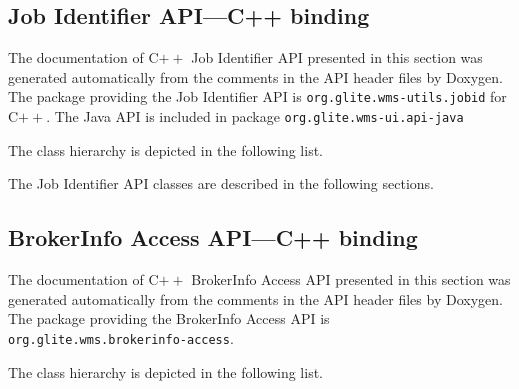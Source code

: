 \documentclass{egee}
\begin{document}
\subsection{Job Identifier API---C++ binding}
\label{jobidcpp}
{
\renewenvironment{CompactList}{\itemize\itemsep -2pt}{\enditemize}
\def\section#1{}
\renewcommand{\contentsline}[4]{{\bf #2}\leaders\hbox{.}\hfill #3}
The documentation of C$++$ Job Identifier API presented in this section was
generated automatically from the comments in the API header files by Doxygen.
The package providing the Job Identifier API is {\verb!org.glite.wms-utils.jobid!} for C$++$. The Java API is included
in package {\verb!org.glite.wms-ui.api-java!}

The class hierarchy is depicted in the following list.

}

\noindent The Job Identifier API classes are described in the
following sections. 
{

\let\ddescription=\description
\let\denddescription=\enddescription
\renewenvironment{description}{\list{}{\labelwidth 4cm\leftmargin 4cm}}{\endlist}






}


\subsection{BrokerInfo Access API---C++ binding}
\label{brki}
{
\renewenvironment{CompactList}{\itemize\itemsep -2pt}{\enditemize}
\def\section#1{}
\renewcommand{\contentsline}[4]{{\bf #2}\leaders\hbox{.}\hfill #3}
The documentation of C$++$ BrokerInfo Access API presented in this section was generated automatically from the
comments in the API header files by Doxygen. The package providing the BrokerInfo Access API is 
{\verb!org.glite.wms.brokerinfo-access!}.

The class hierarchy is depicted in the following list.

}
\end{document}

